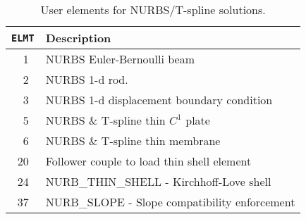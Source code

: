 
\begin{table}[t]
\begin{center}
\begin{tabular}{| r | p{11cm}|} \hline
\texttt{ELMT} & Description \\ \hline
 1~ & NURBS Euler-Bernoulli beam \\
 2~ & NURBS 1-d rod. \\
 3~ & NURBS 1-d displacement boundary condition \\ 
 5~ & NURBS \& T-spline thin $C^1$ plate \\
 6~ & NURBS \& T-spline thin membrane \\
20~ & Follower couple to load thin shell element \\
24~ & NURB\_THIN\_SHELL - Kirchhoff-Love shell \\
37~ & NURB\_SLOPE - Slope compatibility enforcement \\ \hline
\end{tabular}
\caption{User elements for NURBS/T-spline solutions. \label{tab2iga} }
\end{center}
\end{table}

